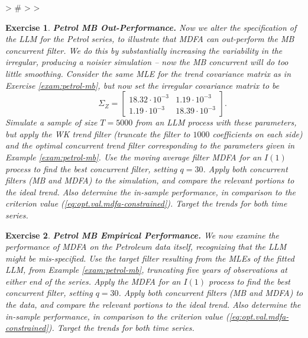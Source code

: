 \documentclass[a4paper]{book}
\newtheorem{Exercise}{Exercise}
\begin{document}
\begin{Schunk}
\begin{Sinput}
> #
> 
> 
\end{Sinput}
\end{Schunk}


\begin{Exercise} {\bf Petrol MB Out-Performance.}  \rm
\label{exer:petrol-mb2}
 Now we alter the specification of the LLM for the Petrol series,
  to illustrate that MDFA can out-perform the MB concurrent filter.  
  We do this by substantially increasing the
 variability in the irregular, producing a noisier simulation -- now the MB concurrent will do too little smoothing.  Consider the same MLE for the trend covariance
  matrix as in Exercise \ref{exam:petrol-mb}, but now set the irregular
 covariance matrix to be
\[
   \qquad  \Sigma_{Z} = \left[ \begin{array}{ll}
       18.32 \cdot 10^{-3}  &  1.19 \cdot 10^{-3}   \\
       1.19 \cdot 10^{-3}  &  18.39 \cdot 10^{-3}  \end{array} \right].
\]
 Simulate a sample of size $T=5000$ from an LLM process with these parameters,
 but apply  the WK trend filter
(truncate the filter to $1000$ coefficients on each side) and the 
 optimal concurrent trend filter  corresponding to the parameters
  given in Example \ref{exam:petrol-mb}.  
 Use the moving average filter  MDFA  for an $I(1)$ process  to find the best
 concurrent filter, setting $q= 30$.
    Apply both concurrent filters (MB and MDFA)
 to the simulation, and compare the relevant portions to the ideal trend.
 Also determine the in-sample performance, in comparison to the criterion value
 (\ref{eq:opt.val.mdfa-constrained}).   Target the trends for both time series.
\end{Exercise}

\begin{Exercise} {\bf Petrol MB Empirical Performance.}  \rm
\label{exer:petrol-mb3}
 We now examine the performance of MDFA   on the Petroleum data itself,
 recognizing that the LLM might be mis-specified.  
 Use the target filter resulting from the MLEs of the fitted LLM,
  from Example \ref{exam:petrol-mb}, truncating five years of observations at either end
   of the series.  
 Apply the  MDFA  for an $I(1)$ process  to find the best
 concurrent filter, setting $q= 30$.
  Apply both concurrent filters (MB and MDFA)
 to the data, and compare the relevant portions to the ideal trend.
 Also determine the in-sample performance, in comparison to the criterion value
 (\ref{eq:opt.val.mdfa-constrained}).   Target the trends for both time series.
\end{Exercise}
    
\end{document}
